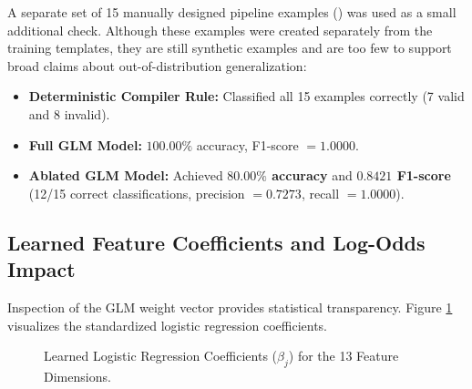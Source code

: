 \documentclass[12pt,a4paper]{article}
\begin{document}
A separate set of 15 manually designed pipeline examples () was used as a small additional check. Although these examples were created separately from the training templates, they are still synthetic examples and are too few to support broad claims about out-of-distribution generalization:
\begin{itemize}
    \item \textbf{Deterministic Compiler Rule:} Classified all 15 examples correctly (7 valid and 8 invalid).
    \item \textbf{Full GLM Model:} $100.00\%$ accuracy, F1-score $= 1.0000$.
    \item \textbf{Ablated GLM Model:} Achieved \textbf{$80.00\%$ accuracy} and \textbf{$0.8421$ F1-score} (12/15 correct classifications, precision $= 0.7273$, recall $= 1.0000$).
\end{itemize}

\subsection{Learned Feature Coefficients and Log-Odds Impact}

Inspection of the GLM weight vector provides statistical transparency. Figure \ref{fig:coefficients} visualizes the standardized logistic regression coefficients.

\begin{figure}[H]
\centering
{}
\caption{Learned Logistic Regression Coefficients ($\beta_j$) for the 13 Feature Dimensions.}
\label{fig:coefficients}
\end{figure}
\end{document}

